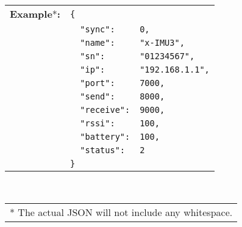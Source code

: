 \begin{table}[H]
    \begin{tabular}{l l l}
        \textbf{Example}*\textbf{:} & \texttt{\{}\\
        & \texttt{~~"sync":} & \texttt{0,}\\
        & \texttt{~~"name":} & \texttt{"x-IMU3",}\\
        & \texttt{~~"sn":} & \texttt{"01234567",}\\
        & \texttt{~~"ip":} & \texttt{"192.168.1.1",}\\
        & \texttt{~~"port":} & \texttt{7000,}\\
        & \texttt{~~"send":} & \texttt{8000,}\\
        & \texttt{~~"receive":} & \texttt{9000,}\\
        & \texttt{~~"rssi":} & \texttt{100,}\\
        & \texttt{~~"battery":} & \texttt{100,}\\
        & \texttt{~~"status":} & \texttt{2}\\
        & \texttt{\}}
    \end{tabular}\\
    \begin{tabular}{l}
        \\
        \footnotesize{* The actual \acs{JSON} will not include any whitespace.}
    \end{tabular}
\end{table}
